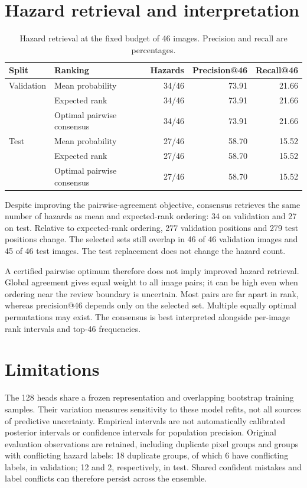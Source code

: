 \documentclass[10pt,a4paper]{article}
\begin{document}
\section{Hazard retrieval and interpretation}
\begin{table}[H]
\centering
\caption{Hazard retrieval at the fixed budget of 46 images. Precision and recall are percentages.}
\label{tab:consensus-retrieval}
\small
\begin{tabular}{llrrr}
\toprule
Split & Ranking & Hazards & Precision@46 & Recall@46 \\
\midrule
Validation & Mean probability & 34/46 & 73.91 & 21.66 \\
 & Expected rank & 34/46 & 73.91 & 21.66 \\
 & Optimal pairwise consensus & 34/46 & 73.91 & 21.66 \\
\midrule
Test & Mean probability & 27/46 & 58.70 & 15.52 \\
 & Expected rank & 27/46 & 58.70 & 15.52 \\
 & Optimal pairwise consensus & 27/46 & 58.70 & 15.52 \\
\bottomrule
\end{tabular}
\end{table}

Despite improving the pairwise-agreement objective, consensus retrieves the same
number of hazards as mean and expected-rank ordering: 34 on validation and 27 on
test. Relative to expected-rank ordering, 277 validation positions and 279 test
positions change. The selected sets still overlap in 46 of 46 validation images
and 45 of 46 test images. The test replacement does not change the hazard count.

A certified pairwise optimum therefore does not imply improved hazard retrieval.
Global agreement gives equal weight to all image pairs; it can be high even when
ordering near the review boundary is uncertain. Most pairs are far apart in rank,
whereas precision@46 depends only on the selected set. Multiple equally optimal
permutations may exist. The consensus is best interpreted alongside per-image
rank intervals and top-46 frequencies.

\section{Limitations}
The 128 heads share a frozen representation and overlapping bootstrap training
samples. Their variation measures sensitivity to these model refits, not all
sources of predictive uncertainty. Empirical intervals are not automatically
calibrated posterior intervals or confidence intervals for population precision.
Original evaluation observations are retained, including duplicate pixel groups
and groups with conflicting hazard labels: 18 duplicate groups, of which 6 have
conflicting labels, in validation; 12 and 2, respectively, in test. Shared confident
mistakes and label conflicts can therefore persist across the ensemble.
\end{document}
